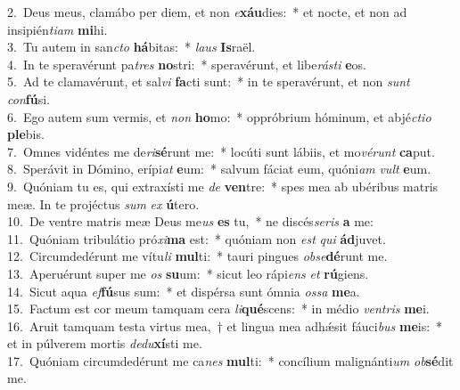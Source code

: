 {2.~}Deus meus, clamábo per diem, et non \textit{e}\textbf{xáu}dies:~* et nocte, et non ad insipién\textit{ti}\textit{am} \textbf{mi}hi.\\
{3.~}Tu autem in san\textit{cto} \textbf{há}bitas:~* \textit{laus} \textbf{Is}raël.\\
{4.~}In te speravérunt pa\textit{tres} \textbf{no}stri:~* speravérunt, et libe\textit{rá}\textit{sti} \textbf{e}os.\\
{5.~}Ad te clamavérunt, et sal\textit{vi} \textbf{fa}cti sunt:~* in te speravérunt, et non \textit{sunt} \textit{con}\textbf{fú}si.\\
{6.~}Ego autem sum vermis, et \textit{non} \textbf{ho}mo:~* oppróbrium hóminum, et abjé\textit{cti}\textit{o} \textbf{ple}bis.\\
{7.~}Omnes vidéntes me de\textit{ri}\textbf{sé}runt me:~* locúti sunt lábiis, et mo\textit{vé}\textit{runt} \textbf{ca}put.\\
{8.~}Sperávit in Dómino, erípi\textit{at} \textbf{e}um:~* salvum fáciat eum, quóni\textit{am} \textit{vult} \textbf{e}um.\\
{9.~}Quóniam tu es, qui extraxísti me \textit{de} \textbf{ven}tre:~* spes mea ab ubéribus matris meæ. In te projéctus \textit{sum} \textit{ex} \textbf{ú}tero.\\
{10.~}De ventre matris meæ Deus me\textit{us} \textbf{es} tu,~* ne discés\textit{se}\textit{ris} \textbf{a} me:\\
{11.~}Quóniam tribulátio pró\textit{xi}\textbf{ma} est:~* quóniam non \textit{est} \textit{qui} \textbf{ád}juvet.\\
{12.~}Circumdedérunt me vítu\textit{li} \textbf{mul}ti:~* tauri pingues \textit{ob}\textit{se}\textbf{dé}runt me.\\
{13.~}Aperuérunt super me \textit{os} \textbf{su}um:~* sicut leo rápi\textit{ens} \textit{et} \textbf{rú}giens.\\
{14.~}Sicut aqua \textit{ef}\textbf{fú}sus sum:~* et dispérsa sunt ómnia \textit{os}\textit{sa} \textbf{me}a.\\
{15.~}Factum est cor meum tamquam cera \textit{li}\textbf{qué}scens:~* in médio \textit{ven}\textit{tris} \textbf{me}i.\\
{16.~}Aruit tamquam testa virtus mea,~† et lingua mea adhǽsit fáuci\textit{bus} \textbf{me}is:~* et in púlverem mortis \textit{de}\textit{du}\textbf{xí}sti me.\\
{17.~}Quóniam circumdedérunt me ca\textit{nes} \textbf{mul}ti:~* concílium malignánti\textit{um} \textit{ob}\textbf{sé}dit me.\\

